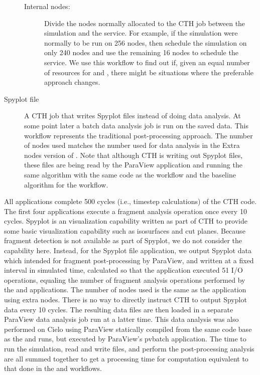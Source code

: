 \begin{description}
\begin{description}
  \item[Internal nodes:] Divide the nodes normally allocated to the CTH job
    between the simulation and the \vda service.  For example, if the
    simulation were normally to be run on 256 nodes, then schedule the
    simulation on only 240 nodes and use the remaining 16 nodes to schedule
    the \vda service.  We use this workflow to find out if, given an equal
    number of resources for \insitu and \intransit, there might be
    situations where the preferable approach changes.

  \end{description}

\item [Spyplot file] A CTH job that writes Spyplot files instead of doing
  data analysis.  At some point later a batch data analysis job is run on the saved
  data.  This workflow represents the traditional post-processing approach.
  The number of nodes used matches the number used for data analysis in the Extra
  nodes version of \intransit.  Note that although CTH is writing out
  Spyplot files, these files are being read by the ParaView application and
  running the same algorithm with the same code as the \intransit workflow
  and the baseline algorithm for the \insitu workflow.

\end{description}

All applications complete 500 cycles (i.e., timestep calculations) of the
CTH code. The first four applications execute a fragment analysis operation
once every 10 cycles.  Spyplot is an \insitu visualization capability
written as part of CTH to provide some basic visualization capability such
as isosurfaces and cut planes.  Because fragment detection is not available
as part of Spyplot, we do not consider the \insitu capability here.
Instead, for the Spyplot file application, we output Spyplot data which
intended for fragment post-processing by ParaView, and written at a fixed
interval in simulated time, calculated so that the application executed 51
I/O operations, equaling the number of fragment analysis operations
performed by the \insitu and \intransit applications.  The number of nodes
used is the same as the \intransit application using extra nodes. There
is no way to directly instruct CTH to output Spyplot data every 10 cycles.
The resulting data files are then loaded in a separate ParaView data
analysis job run at a latter time.  This data analysis was also performed
on Cielo using ParaView statically compiled from the same code base as the
\insitu and \intransit runs, but executed by ParaView's pvbatch
application.  The time to run the simulation, read and write files, and
perform the post-processing analysis are all summed together to get a
processing time for computation equivalent to that done in the \insitu and
\intransit workflows.

